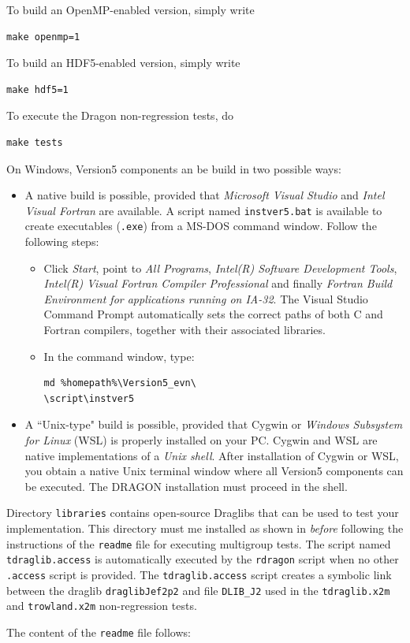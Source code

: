\noindent To build an OpenMP-enabled version, simply write
\begin{verbatim}
make openmp=1
\end{verbatim}

\noindent To build an HDF5-enabled version, simply write
\begin{verbatim}
make hdf5=1
\end{verbatim}

\noindent To execute the Dragon non-regression tests, do
\begin{verbatim}
make tests
\end{verbatim}

\vskip 0.08cm

On Windows, Version5 components an be build in two possible ways:
\begin{itemize}
\item  A native build is possible, provided that {\sl Microsoft Visual Studio} and {\sl Intel Visual Fortran} are available.
A script named {\tt instver5.bat} is available to create executables ({\tt .exe}) from a MS-DOS command
window. Follow the following steps:
\begin{itemize}
\item Click {\sl Start}, point to {\sl All Programs}, {\sl Intel(R) Software Development Tools}, {\sl Intel(R) Visual Fortran
Compiler Professional} and finally {\sl Fortran Build Environment for applications running on IA-32}. The Visual Studio Command Prompt
automatically sets the correct paths of both C and Fortran compilers, together with their associated libraries.
\item In the command window, type:
\begin{verbatim}
md %homepath%\Version5_evn\
\script\instver5
\end{verbatim}
\end{itemize}
\item  A ``Unix-type" build is possible, provided that Cygwin\cite{cygwin} or {\sl Windows Subsystem for Linux} (WSL)\cite{wsl} is
properly installed on your PC. Cygwin and WSL are native implementations of a {\sl Unix shell}. After installation of Cygwin or WSL, you
obtain a native Unix terminal window where all Version5 components can be executed. The DRAGON installation must proceed in the shell.
\end{itemize}

\vskip 0.08cm

Directory {\tt libraries} contains open-source Draglibs that can be used to
test your implementation. This directory must me installed as shown in 
{\sl before} following the instructions of the {\tt readme} file for executing
multigroup tests. The script named
{\tt tdraglib.access} is automatically executed by the {\tt rdragon} script when
no other {\tt *.access} script is provided. The {\tt tdraglib.access} script creates
a symbolic link between the draglib {\tt draglibJef2p2} and file {\tt DLIB\_J2}
used in the {\tt tdraglib.x2m} and {\tt trowland.x2m} non-regression tests.

\vskip 0.08cm

The content of the {\tt readme} file follows:

